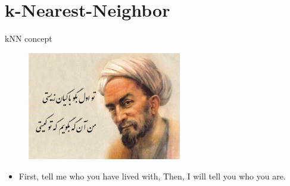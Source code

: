 \documentclass[serif, aspectratio=169]{beamer}
\begin{document}
\section{k-Nearest-Neighbor}
    
\begin{frame}{kNN concept}
    \begin{figure}[h]
            \centering
            \includegraphics[width=0.6\textwidth]{pic/Saadi.png}
            \end{figure}
    \begin{itemize}
        \item First, tell me who you have lived with,
Then, I will tell you who you are.
    \end{itemize}
    
    
\end{frame}
\end{document}
